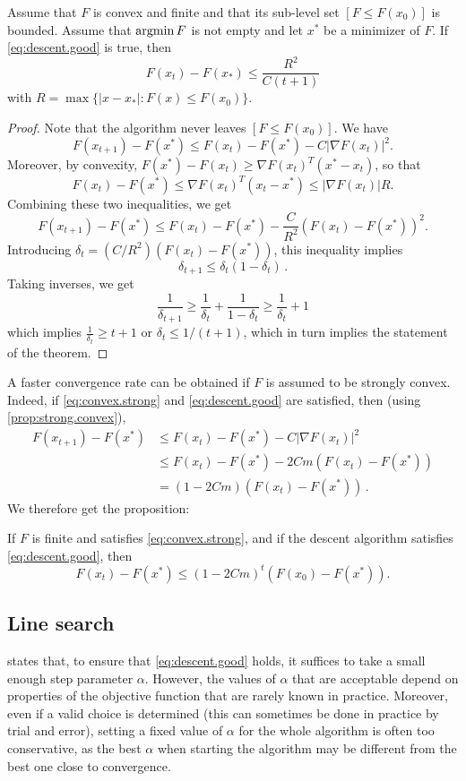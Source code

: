 \begin{theorem}
\label{th:grad.desc.convex}
Assume that $F$ is convex and finite and that its sub-level set $[F\leq F(x_0)]$ is bounded. Assume that $\operatorname*{argmin} F$ is not empty and let $x^*$ be a minimizer of $F$. If \cref{eq:descent.good} is true, 
then
\[
F(x_{t}) - F(x_*) \leq \frac{R^2}{C(t+1)}
\]
with $R = \max\{|x - x_*|: F(x) \leq F(x_0)\}$.
\end{theorem}
\begin{proof}
Note that the algorithm never leaves $[F\leq F(x_0)]$.
We have 
\[
F(x_{t+1}) - F(x^*) \leq F(x_t) - F(x^*) - C |\nabla F(x_t)|^2.
\]
Moreover,  by convexity, $F(x^{*}) - F(x_t) \geq \nabla F(x_t)^T (x^*-x_t)$, so that 
\[
F(x_t) - F(x^*) \leq \nabla F(x_t)^T (x_t-x^*) \leq |\nabla F(x_t)| R.
\]
Combining these two inequalities, we get
\[
F(x_{t+1}) - F(x^*) \leq F(x_t) - F(x^*) - \frac{C}{R^2}  (F(x_t) - F(x^*))^2.
\]
Introducing $\delta_t = (C/R^2) (F(x_t) - F(x^*))$, this inequality implies
\[
\delta_{t+1} \leq \delta_t (1-\delta_t)\,.
\]
Taking inverses, we get
\[
\frac1{\delta_{t+1}} \geq \frac1{\delta_t} + \frac1{1-\delta_t} \geq \frac1{\delta_t} + 1
\]
which implies $\frac{1}{\delta_t} \geq t+1$ or
$\delta_t \leq 1/(t+1)$, which in turn implies the statement of the theorem. 
\end{proof}

A faster convergence rate can be obtained if $F$ is assumed to be strongly convex. Indeed, if \cref{eq:convex.strong} and \cref{eq:descent.good} are satisfied, then (using \cref{prop:strong.convex}),
\begin{align*}
F(x_{t+1}) - F(x^*) &\leq F(x_t) - F(x^*) - C |\nabla F(x_t)|^2 \\
&\leq F(x_t) - F(x^*) - 2Cm (F(x_t) - F(x^*)) 
\\
&= (1-2Cm)  (F(x_t) - F(x^*))\,.
\end{align*}
We therefore get the proposition:
\begin{proposition}
\label{prop:strong.convex.conv}
If $F$ is finite and  satisfies \cref{eq:convex.strong}, and if  the descent algorithm satisfies \cref{eq:descent.good}, then
\[
F(x_{t}) - F(x^*) \leq (1-2Cm)^t (F(x_0) - F(x^*)).
\]
\end{proposition}

\subsection{Line search}
 states that, to ensure that \cref{eq:descent.good} holds, it suffices to take a small enough step parameter $\alpha$. However, the   values of $\alpha$ that are acceptable depend on properties of the objective function that are rarely known in practice. Moreover, even if a valid choice is determined (this can  sometimes be done in practice by trial and error), setting a fixed value of $\alpha$ for the whole algorithm is often too conservative, as the best $\alpha$ when starting the algorithm may be different from the best one close to convergence.

